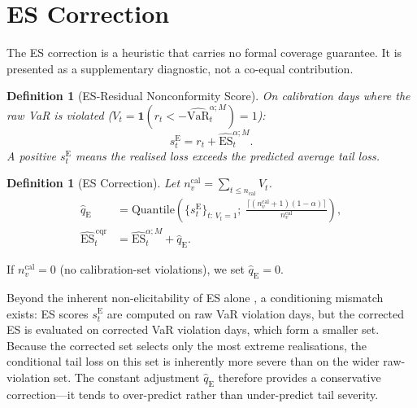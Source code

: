 \documentclass[preprint,11pt,authoryear]{elsarticle}
\newtheorem{definition}[theorem]{Definition}
\newcommand{\VaR}{\mathrm{VaR}}
\newcommand{\ES}{\mathrm{ES}}
\newcommand{\1}{\boldsymbol{1}}
\newcommand{\qE}{\hat{q}_{\scriptscriptstyle\mathrm{E}}}
\newcommand{\EScqr}{\widehat{\ES}^{\,\mathrm{cqr}}}
\begin{document}
	
	\section{ES Correction}
	\label{app:es}
	
	The ES correction is a heuristic that carries no formal coverage guarantee. It is presented as a supplementary diagnostic, not a co-equal contribution.
	
	\begin{definition}[ES-Residual Nonconformity Score]
		\label{def:es_score}
		On calibration days where the raw VaR is violated ($V_t = \1(r_t < -\widehat{\VaR}_t^{\alpha;M}) = 1$):
		\begin{equation}
			s_t^{\mathrm{E}} = r_t + \widehat{\ES}_t^{\alpha;M}.
			\label{eq:es_score}
		\end{equation}
		A positive $s_t^{\mathrm{E}}$ means the realised loss exceeds the predicted average tail loss.
	\end{definition}
	
	\begin{definition}[ES Correction]
		\label{def:qhat_E}
		Let $n_v^{\mathrm{cal}} = \sum_{t \leq n_{\mathrm{cal}}} V_t$.
		\begin{align}
			\qE &= \mathrm{Quantile}\!\left(
			\{s_t^{\mathrm{E}}\}_{t:\,V_t=1};\;
			\tfrac{\lceil(n_v^{\mathrm{cal}}+1)(1-\alpha)\rceil}
			{n_v^{\mathrm{cal}}}
			\right), \label{eq:qhat_E}\\
			\EScqr_t &= \widehat{\ES}_t^{\alpha;M} + \qE.
			\label{eq:ES_cqr}
		\end{align}
	\end{definition}
	
	If $n_v^{\mathrm{cal}} = 0$ (no calibration-set violations), we set $\qE = 0$.
	
	Beyond the inherent non-elicitability of ES alone \citep{gneiting2011making}, a conditioning mismatch exists: ES scores $s_t^{\mathrm{E}}$ are computed on raw VaR violation days, but the corrected ES is evaluated on corrected VaR violation days, which form a smaller set. Because the corrected set selects only the most extreme realisations, the conditional tail loss on this set is inherently more severe than on the wider raw-violation set. The constant adjustment $\qE$ therefore provides a conservative correction---it tends to over-predict rather than under-predict tail severity.
	
\end{document}
